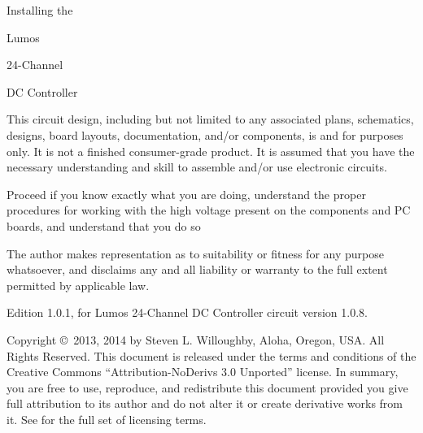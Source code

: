 \documentclass[letterpaper,twoside,onecolumn,openright,final]{memoir}
\begin{document}
\frontmatter

\thispagestyle{empty}
\vfill
\begin{center}
{\fontsize{48}{50}\selectfont
\strut Installing the \\\strut Lumos\TM\\\strut
24-Channel \\\strut DC Controller}

\vfill

\end{center}

\newpage
\begin{center}


\end{center}

This circuit design, including but not limited to any associated plans, schematics, designs, board layouts, documentation, 
and/or components, is  and for  purposes only. It is not a finished consumer-grade product.
It is assumed that you have the necessary understanding and skill to assemble and/or use electronic circuits.

Proceed  if you know exactly what you are doing, understand the proper procedures for working with the high voltage present on the components and PC boards, and understand that you do so 

The author makes  representation as to suitability or fitness for any purpose whatsoever, and disclaims any and all liability or warranty to the full extent permitted by applicable law.

\strut\vfill
\noindent Edition 1.0.1, for Lumos 24-Channel DC Controller circuit version 1.0.8.

\smallskip


\noindent Copyright \copyright\ 2013, 2014 by Steven L. Willoughby,
Aloha, Oregon, USA.  All Rights Reserved.  
This document is released under the terms and conditions of the 
Creative Commons ``Attribution-NoDerivs 3.0 Unported'' license.  
In summary, you are free to use, reproduce, and redistribute this 
document provided you give full attribution to its author and do not
alter it or create derivative works from it.  See
 for the full
set of licensing terms.
\end{document}
